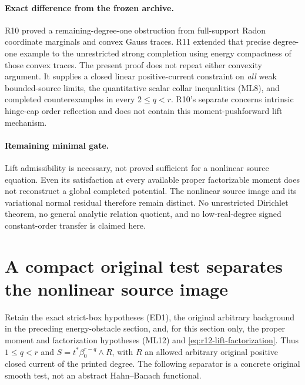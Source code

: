 \documentclass[11pt,a4paper]{article}
\numberwithin{equation}{section}
\theoremstyle{definition}
\theoremstyle{remark}
\begin{document}
\paragraph{Exact difference from the frozen archive.}
R10 
proved a remaining-degree-one obstruction from full-support
Radon coordinate marginals and convex Gauss traces.  R11
 extended
that precise degree-one example to the unrestricted strong
completion using energy compactness of those convex traces.
The present proof does not repeat either convexity argument.
It supplies a closed linear positive-current constraint on
\emph{all} weak bounded-source limits, the quantitative scalar
collar inequalities \textup{(ML8)}, and completed counterexamples
in every $2\le q<r$.  R10's separate
 concerns intrinsic
hinge-cap order reflection and does not contain this
moment-pushforward lift mechanism.

\paragraph{Remaining minimal gate.}
Lift admissibility is necessary, not proved sufficient for a
nonlinear source equation.  Even its satisfaction at every
available proper factorizable moment does not reconstruct a
global completed potential.  The nonlinear source image and
its variational normal residual therefore remain distinct.
No unrestricted Dirichlet theorem, no general analytic relation
quotient, and no low-real-degree signed constant-order transfer
is claimed here.



\section{A compact original test separates the nonlinear source image}
\label{sec:r12-moment-source-separation}

Retain the exact strict-box hypotheses \textup{(ED1)}, the
original arbitrary background in the preceding energy-obstacle
section, and, for this section only, the proper moment and
factorization hypotheses \textup{(ML12)} and
\eqref{eq:r12-lift-factorization}.  Thus $1\le q<r$ and
$S=t^*\beta_0^{r-q}\wedge R$, with $R$ an allowed arbitrary
original positive closed current of the printed degree.
The following separator is a concrete original smooth test,
not an abstract Hahn--Banach functional.
\end{document}
